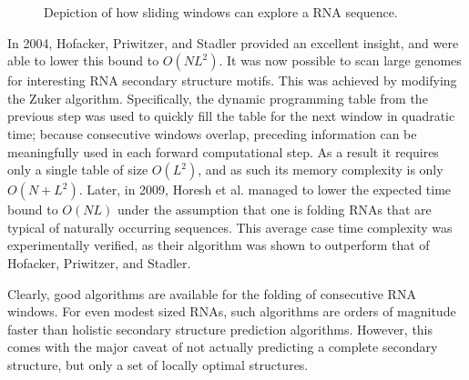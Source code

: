 \documentclass{cshonours}
\begin{document}
\begin{figure}
\begin{center}
\end{center}
\caption{Depiction of how sliding windows can explore a RNA sequence.}
\label{fig:slidingwindow}
\end{figure}

In 2004, Hofacker, Priwitzer, and Stadler \cite{hofacker2004prediction} provided an excellent insight, and were
able to lower this bound to $O(NL^2)$. It was now possible to scan large genomes
for interesting RNA secondary structure motifs. This was achieved by modifying the Zuker algorithm. Specifically, the dynamic programming table from the previous step was used to quickly fill the table for
the next window in quadratic time; because consecutive windows overlap, preceding information can be meaningfully used in each forward computational step.
As a result it requires only a single table of size $O(L^2)$, and as such its memory complexity is only $O(N + L^2)$. Later, in 2009, Horesh et al. \cite{horesh2009rnaslider} managed
to lower the expected time bound to $O(NL)$ under the assumption that one is
folding RNAs that are typical of naturally occurring sequences. This average case time complexity was experimentally verified, as their algorithm was shown to outperform that of Hofacker, Priwitzer, and Stadler. 

Clearly, good algorithms are
available for the folding of consecutive RNA windows. For even modest sized
RNAs, such algorithms are orders of magnitude faster than holistic secondary
structure prediction algorithms. However, this comes with the major caveat of not actually predicting
a complete secondary structure, but only a set of locally optimal structures.
\end{document}
